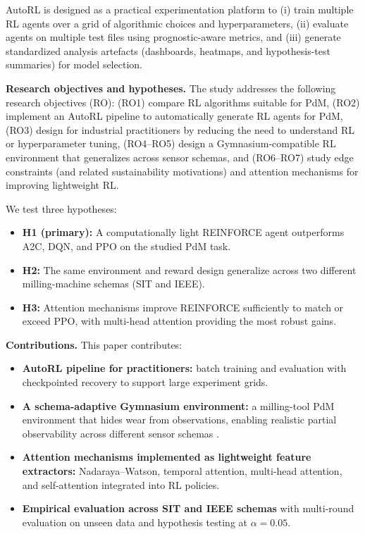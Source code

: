 \documentclass[refree,sn-basic]{sn-jnl} %
\begin{document}
AutoRL is designed as a practical experimentation platform to (i) train multiple RL agents over a grid of algorithmic choices and hyperparameters, (ii) evaluate agents on multiple test files using prognostic-aware metrics, and (iii) generate standardized analysis artefacts (dashboards, heatmaps, and hypothesis-test summaries) for model selection.

\textbf{Research objectives and hypotheses.}
The study addresses the following research objectives (RO): (RO1) compare RL algorithms suitable for PdM, (RO2) implement an AutoRL pipeline to automatically generate RL agents for PdM, (RO3) design for industrial practitioners by reducing the need to understand RL or hyperparameter tuning, (RO4--RO5) design a Gymnasium-compatible RL environment that generalizes across sensor schemas, and (RO6--RO7) study edge constraints (and related sustainability motivations) and attention mechanisms for improving lightweight RL.

We test three hypotheses:
\begin{itemize}
        \item \textbf{H1 (primary):} A computationally light REINFORCE agent outperforms A2C, DQN, and PPO on the studied PdM task.
        \item \textbf{H2:} The same environment and reward design generalize across two different milling-machine schemas (SIT and IEEE).
        \item \textbf{H3:} Attention mechanisms improve REINFORCE sufficiently to match or exceed PPO, with multi-head attention providing the most robust gains.
\end{itemize}

\textbf{Contributions.}
This paper contributes:
\begin{itemize}
        \item \textbf{AutoRL pipeline for practitioners:} batch training and evaluation with checkpointed recovery to support large experiment grids.
        \item \textbf{A schema-adaptive Gymnasium environment:} a milling-tool PdM environment that hides wear from observations, enabling realistic partial observability across different sensor schemas \cite{Foundation2023}.
        \item \textbf{Attention mechanisms implemented as lightweight feature extractors:} Nadaraya--Watson, temporal attention, multi-head attention, and self-attention integrated into RL policies.
        \item \textbf{Empirical evaluation across SIT and IEEE schemas} with multi-round evaluation on unseen data and hypothesis testing at $\alpha=0.05$.
\end{itemize}
\end{document}

